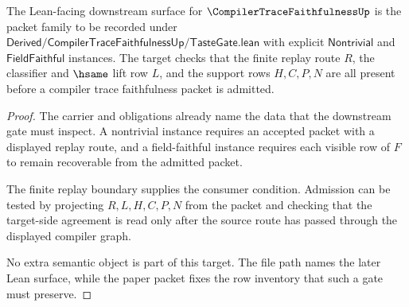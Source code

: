 \begin{theorem}
\label{thm:compiler-trace-faithfulness-downstream-target}
The Lean-facing downstream surface for $\CompilerTraceFaithfulnessUp$ is the packet family to be recorded under $\mathsf{Derived/CompilerTraceFaithfulnessUp/TasteGate.lean}$ with explicit $\mathsf{Nontrivial}$ and $\mathsf{FieldFaithful}$ instances. The target checks that the finite replay route $R$, the classifier and $\hsame$ lift row $L$, and the support rows $H,C,P,N$ are all present before a compiler trace faithfulness packet is admitted.
\end{theorem}
\begin{proof}
The carrier and obligations already name the data that the downstream gate must inspect. A nontrivial instance requires an accepted packet with a displayed replay route, and a field-faithful instance requires each visible row of $F$ to remain recoverable from the admitted packet.

The finite replay boundary supplies the consumer condition. Admission can be tested by projecting $R,L,H,C,P,N$ from the packet and checking that the target-side agreement is read only after the source route has passed through the displayed compiler graph.

No extra semantic object is part of this target. The file path names the later Lean surface, while the paper packet fixes the row inventory that such a gate must preserve.
\end{proof}


\begin{closurestatus}{\CompilerTraceFaithfulnessUp}
  \theoryclosure{\matureClosure}
  \formalstatus{\unformalizedV}
\end{closurestatus}
